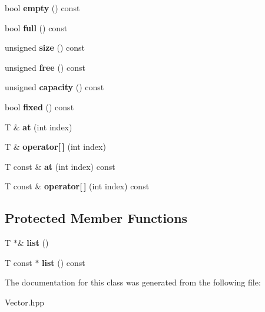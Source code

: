 \begin{DoxyCompactItemize}
\mbox{\label{classVector_ad688a8a0dfbd07ea63d838058a436f79}} 
bool {\bfseries empty} () const
\item 
\mbox{\label{classVector_a31a67e97a324510bff15ea79c64839af}} 
bool {\bfseries full} () const
\item 
\mbox{\label{classVector_a7eef7a769093f4486f3b2083436bf270}} 
unsigned {\bfseries size} () const
\item 
\mbox{\label{classVector_a1c11aef701f6eb3194946594d064af09}} 
unsigned {\bfseries free} () const
\item 
\mbox{\label{classVector_a30435b1635ae160705f53755d25a407b}} 
unsigned {\bfseries capacity} () const
\item 
\mbox{\label{classVector_ada65b076d4102d21479cdb00fec6b6a1}} 
bool {\bfseries fixed} () const
\item 
\mbox{\label{classVector_a0a53d8de64ae7cc1e388df4e46ab06bf}} 
T \& {\bfseries at} (int index)
\item 
\mbox{\label{classVector_a2054758707c08325ef160fd4dfc48ff7}} 
T \& {\bfseries operator\mbox{[}$\,$\mbox{]}} (int index)
\item 
\mbox{\label{classVector_a2539a2d9ca64fd4e400d1bdc23dc292c}} 
T const  \& {\bfseries at} (int index) const
\item 
\mbox{\label{classVector_a491327d90df15af7ee79c6705f005491}} 
T const  \& {\bfseries operator\mbox{[}$\,$\mbox{]}} (int index) const
\end{DoxyCompactItemize}
\subsection*{Protected Member Functions}
\begin{DoxyCompactItemize}
\item 
\mbox{\label{classVector_aad3f85e26470d99139e3f96053bdacc4}} 
T $\ast$\& {\bfseries list} ()
\item 
\mbox{\label{classVector_a2aaf129778179680e5932d96aa5471eb}} 
T const  $\ast$ {\bfseries list} () const
\end{DoxyCompactItemize}


The documentation for this class was generated from the following file\+:\begin{DoxyCompactItemize}
\item 
Vector.\+hpp\end{DoxyCompactItemize}
